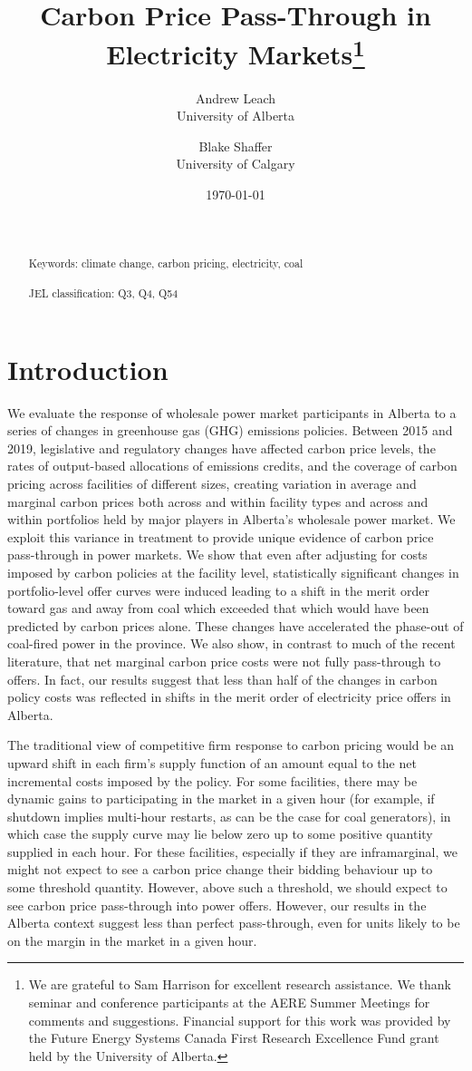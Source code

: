 \documentclass[12pt]{article}
\title{Carbon Price Pass-Through in Electricity Markets\thanks{We are grateful to Sam Harrison for excellent
research assistance. We thank seminar and conference participants at the AERE Summer Meetings for comments and suggestions. Financial support for this work was provided by the Future Energy Systems Canada First Research Excellence Fund grant held by the University of Alberta.}
}
\date{\today}
\author{Andrew Leach\\
 University of Alberta
 \and
Blake Shaffer\\University of Calgary}
\begin{document}
\maketitle




\begin{abstract}
\noindent\\ \\
Keywords: climate change, carbon pricing, electricity, coal\\ \\
JEL classification: Q3, Q4, Q54
\end{abstract}

\thispagestyle{empty}
\newpage
\onehalfspacing


\section{Introduction}

We evaluate the response of wholesale power market participants in Alberta to a series of changes in greenhouse gas (GHG) emissions policies.  Between 2015 and 2019, legislative and regulatory changes have affected carbon price levels, the rates of output-based allocations of emissions credits, and the coverage of carbon pricing across facilities of different sizes, creating variation in average and marginal carbon prices both across and within facility types and across and within portfolios held by major players in Alberta's wholesale power market. We exploit this variance in treatment to provide unique evidence of carbon price pass-through in power markets. We show that even after adjusting for costs imposed by carbon policies at the facility level, statistically significant changes in portfolio-level offer curves were induced leading to a shift in the merit order toward gas and away from coal which exceeded that which would have been predicted by carbon prices alone. These changes have accelerated the phase-out of coal-fired power in the province. We also show, in contrast to much of the recent literature, that net marginal carbon price costs were not fully pass-through to offers. In fact, our results suggest that less than half of the changes in carbon policy costs was reflected in shifts in the merit order of electricity price offers in Alberta.

The traditional view of competitive firm response to carbon pricing would be an upward shift in each firm's supply function of an amount equal to the net incremental costs imposed by the policy. For some facilities, there may be dynamic gains to participating in the market in a given hour (for example, if shutdown implies multi-hour restarts, as can be the case for coal generators), in which case the supply curve may lie below zero up to some positive quantity supplied in each hour. For these facilities, especially if they are inframarginal, we might not expect to see a carbon price change their bidding behaviour up to some threshold quantity. However, above such a threshold, we should expect to see carbon price pass-through into power offers. However, our results in the Alberta context suggest less than perfect pass-through, even for units likely to be on the margin in the market in a given hour.
\end{document}

